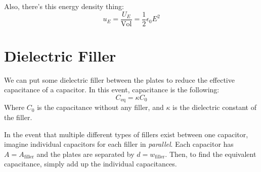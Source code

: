\documentclass[]{article}
\begin{document}
Also, there's this energy density thing:
\[ u_E = \frac{U_E}{\text{Vol}} = \frac{1}{2} \epsilon_0 E^2 \]

\section{Dielectric Filler}
We can put some dielectric filler between the plates to reduce the effective capacitance of a capacitor. In this event, capacitance is the following:
\[ C_{\text{eq}} = \kappa C_0 \]
Where $ C_0 $ is the capacitance without any filler, and $ \kappa $ is the dielectric constant of the filler.

In the event that multiple different types of fillers exist between one capacitor, imagine individual capacitors for each filler in \emph{parallel}. Each capacitor has $ A = A_{\text{filler}} $ and the plates are separated by $ d = w_{\text{filler}} $. Then, to find the equivalent capacitance, simply add up the individual capacitances.
\end{document}
